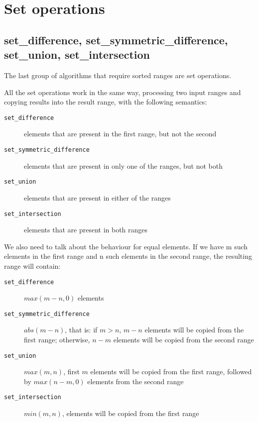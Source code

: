 
\section{Set operations}

\subsection{set\_difference, set\_symmetric\_difference, set\_union, set\_intersection}

The last group of algorithms that require sorted ranges are set operations.


All the set operations work in the same way, processing two input ranges and copying results into the result range, with the following semantics:

\begin{description}
   \item[\texttt{set\_difference}] elements that are present in the first range, but not the second
   \item[\texttt{set\_symmetric\_difference}] elements that are present in only one of the ranges, but not both
   \item[\texttt{set\_union}] elements that are present in either of the ranges
   \item[\texttt{set\_intersection}] elements that are present in both ranges
\end{description}

We also need to talk about the behaviour for equal elements. If we have m such elements in the first range and n such elements in the second range, the resulting range will contain:


\begin{description}
   \item[\texttt{set\_difference}] $max(m-n,0)$ elements
   \item[\texttt{set\_symmetric\_difference}] $abs(m-n)$, that is: if $m>n$, $m-n$ elements will be copied from the first range; otherwise, $n-m$ elements will be copied from the second range
   \item[\texttt{set\_union}] $max(m,n)$, first $m$ elements will be copied from the first range, followed by $max(n-m,0)$ elements from the second range
   \item[\texttt{set\_intersection}] $min(m,n)$, elements will be copied from the first range
\end{description}

